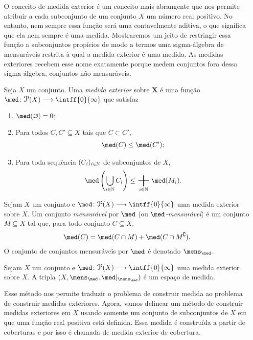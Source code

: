 O conceito de medida exterior é um conceito mais abrangente que nos permite atribuir a cada subconjunto de um conjunto $X$ um número real positivo. No entanto, nem sempre essa função será uma contavelmente aditiva, o que significa que ela nem sempre é uma medida. Mostraremos um jeito de restringir essa função a subconjuntos propícios de modo a termos uma sigma-álgebra de mensuráveis restrita à qual a medida exterior é uma medida. As medidas exteriores recebem esse nome exatamente porque medem conjuntos fora dessa sigma-álgebra, conjuntos não-mensuráveis.

\begin{defi}
Seja $X$ um conjunto. Uma \emph{medida exterior} sobre $\bm X$ é uma função $\med\colon \p(X) \to \intff{0}{\infty}$ que satisfaz
	\begin{enumerate}
	\item $\med(\emptyset)=0$;
	\item Para todos $C,C' \subseteq X$ tais que $C \subset C'$,
		\begin{equation*}
		\med(C) \leq \med(C');
		\end{equation*}
	\item Para toda sequência $(C_i)_{i \in \mathbb{N}}$ de subconjuntos de $X$,
	\begin{equation*}
	\med\left(\bigcup_{i \in \N} C_i\right) \leq \sum_{i \in \N} \med(M_i).
	\end{equation*}
	\end{enumerate}
\end{defi}

\begin{defi}
Sejam $X$ um conjunto e $\med\colon \p(X) \to \intff{0}{\infty}$ uma medida exterior sobre $X$. Um conjunto \emph{mensurável} por $\med$ (ou \emph{$\med$-mensurável}) é um conjunto $M \subseteq X$ tal que, para todo conjunto $C \subseteq X$,
	\begin{equation*}
	\med(C) = \med(C \cap M) + \med(C \cap M^\complement).
	\end{equation*}
O conjunto de conjuntos mensuráveis por $\med$ é denotado $\mens_\med$.
\end{defi}

\begin{prop}
Sejam $X$ um conjunto e $\med\colon \p(X) \to \intff{0}{\infty}$ uma medida exterior sobre $X$. A tripla $(X,\mens_\med,\med|_{\mens_\med})$ é um espaço de medida.
\end{prop}

Esse método nos permite traduzir o problema de construir medida ao problema de construir medidas exteriores. Agora, vamos delinear um método de construir medidas exteriores em $X$ usando somente um conjunto de subconjuntos de $X$ em que uma função real positiva está definida. Essa medida é construída a partir de coberturas e por isso é chamada de medida exterior de cobertura.


